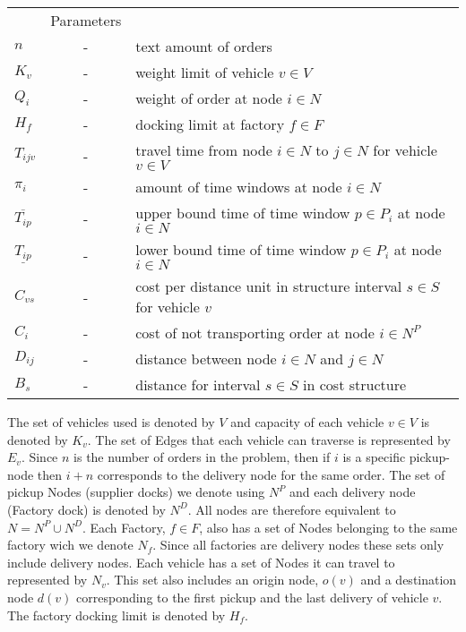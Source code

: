 \documentclass[a4paper,10pt]{article}
\begin{document}
\begin{tabular}{l c l }
    			&Parameters 							\\ 
	$n    	$	&-& text amount of orders 					\\
	$K_v  	$	&-& weight limit of vehicle $v\in V$	 			\\
    	$Q_i  	$	&-& weight of order at node $i\in N$				\\
	$H_f  	$	&-& docking limit at factory $f\in F$				\\
	$T_{ijv}$ 	&-& travel time from node $i\in N$ to $j\in N$ for vehicle 
			    $v\in V$	 						\\
	$\pi_i	$	&-& amount of time windows at node $i\in N$			\\ 
$\overline{T_{ip}} $	&-& upper bound time of time window $p\in P_i$ at node $i\in N$ \\
$\underline{T_{ip}}$	&-& lower bound time of time window $p\in P_i$ at node $i\in N$ \\
	$C_{vs}	$	&-& cost per distance unit in structure interval $s \in S$ for 
			    vehicle $v$ 						\\
	$C_i	$	&-& cost of not transporting order at node $i\in N^P$ 		\\
	$D_{ij}	$ 	&-& distance between node $i\in N$ and  $j\in N$			\\
    	$B_s 	$	&-& distance for interval $s\in S$ in cost structure		\\
\end{tabular}
\linebreak
\linebreak
\par
The set of vehicles used is denoted by $V$ and capacity of each vehicle $v \in V$ is denoted by $K_v$.
The set of Edges that each vehicle can traverse is represented by $E_v$. 
Since $n$ is the number of orders in the problem, then if $i$ is a specific pickup-node then $i+n$ corresponds to the delivery node for the same order.
The set of pickup Nodes (supplier docks) we denote using $N^P$ and each delivery node (Factory dock) is denoted by $N^D$. 
All nodes are therefore equivalent to $N = N^P \cup N^D$. 
Each Factory, $f \in F$, also has a set of Nodes belonging to the same factory wich we denote $N_f$. Since all factories are delivery nodes these sets only include delivery nodes.
Each vehicle has a set of Nodes it can travel to represented by $N_v$.
This set also includes an origin node, $o(v)$ and a destination node $d(v)$ corresponding to the first pickup and the last delivery of vehicle $v$. 
The factory docking limit is denoted by $H_f$. 
\end{document}
